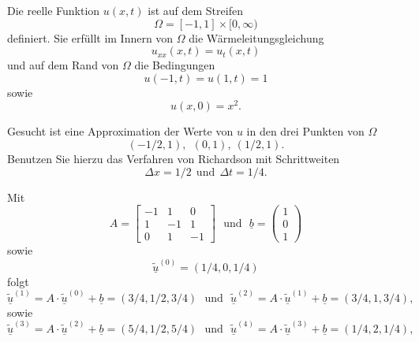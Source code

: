 Die reelle Funktion $u(x,t)$ ist auf dem Streifen
\[
\Omega = [-1, 1] \times [0,\infty)
\]
definiert. Sie erfüllt im Innern von $\Omega$ die Wärmeleitungsgleichung
\[
u_{xx}(x,t) = u_{t}(x,t)
\]
und auf dem Rand von $\Omega$ die Bedingungen
\[
u(-1,t) = u(1,t) = 1
\]
sowie
\[
u(x,0) = x^2. 
\]

Gesucht ist eine Approximation der Werte von $u$ in den drei Punkten von
$\Omega$
\[
(-1/2,1), \ \  (0,1), \ (1/2,1).
\]
Benutzen Sie hierzu das Verfahren von Richardson mit Schrittweiten
\[
\Delta x = 1/2 \ \ \text{und} \ \  \Delta t = 1/4.
\]

\begin{loesung}
Mit
\[
A = \left[\begin{array}{rrr} 
-1 & 1 & 0 \\
1 & -1 & 1 \\ 0 & 1 & -1 \end{array}\right] \ \ \ \text{und} \ \ \   \underline{b} =  \left(\begin{array}{r} 1 \\ 0 \\ 1 \end{array}\right)
\]
sowie
\[
\underline{\tilde u}^{(0)} = (1/4, 0, 1/4)
\]
folgt
\[
\underline{\tilde u}^{(1)} =  A \cdot \underline{\tilde u}^{(0)} + \underline{b} = (3/4, 1/2, 3/4) \ \ \ \text{und} \ \ \ \underline{\tilde u}^{(2)} =  A \cdot \underline{\tilde u}^{(1)} + \underline{b} = (3/4, 1, 3/4),
\]
sowie
\[
\underline{\tilde u}^{(3)} =  A \cdot \underline{\tilde u}^{(2)} + \underline{b} = (5/4, 1/2, 5/4) \ \ \ \text{und} \ \ \ \underline{\tilde u}^{(4)} =  A \cdot \underline{\tilde u}^{(3)} + \underline{b} = (1/4, 2, 1/4),
\]
\end{loesung}

